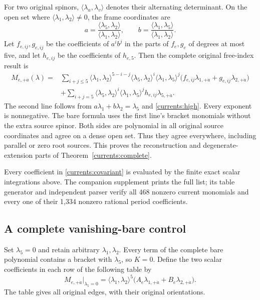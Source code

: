 For two original spinors, $\langle\lambda_u,\lambda_v\rangle$
denotes their alternating determinant. On the open set where
$\langle\lambda_1,\lambda_2\rangle\ne0$, the frame coordinates are
\begin{equation}
 a=\frac{\langle\lambda_5,\lambda_2\rangle}
 {\langle\lambda_1,\lambda_2\rangle},\qquad
 b=\frac{\langle\lambda_1,\lambda_5\rangle}
 {\langle\lambda_1,\lambda_2\rangle}.
\end{equation}
Let $f_{e,ij},g_{e,ij}$ be the coefficients of $a^i b^j$ in the
parts of $f_e,g_e$ of degrees at most five, and let $h_{e,ij}$ be the
coefficients of $h_{e,5}$. Then the complete original free-index result
is
\begin{align}
 M_{e,+\dot a}(\lambda)
 ={}&\sum_{i+j\le5}
 \langle\lambda_1,\lambda_2\rangle^{5-i-j}
 \langle\lambda_5,\lambda_2\rangle^i
 \langle\lambda_1,\lambda_5\rangle^j
 \bigl(f_{e,ij}\lambda_{1,+\dot a}
       +g_{e,ij}\lambda_{2,+\dot a}\bigr)
 \nonumber\\
 &+\sum_{i+j=5}
 \langle\lambda_5,\lambda_2\rangle^i
 \langle\lambda_1,\lambda_5\rangle^j
 h_{e,ij}\lambda_{5,+\dot a}.
 \label{currents:covariant}
\end{align}
The second line follows from
$a\lambda_1+b\lambda_2=\lambda_5$ and
\eqref{currents:high}. Every exponent is nonnegative. The bare formula
uses the first line's bracket monomials without the extra source
spinor. Both sides are polynomial in all original source coordinates
and agree on a dense open set. Thus they agree everywhere, including
parallel or zero root sources. This proves the reconstruction and
degenerate-extension parts of Theorem~\ref{currents:complete}.

Every coefficient in \eqref{currents:covariant} is evaluated by the
finite exact scalar integrations above. The companion supplement
prints the full list; its table generator and independent parser
verify all 468 nonzero current monomials and every one of their
1,334 nonzero rational period coefficients.

\subsection{A complete vanishing-bare control}

Set $\lambda_5=0$ and retain arbitrary $\lambda_1,\lambda_2$.
Every term of the complete bare polynomial contains a bracket with
$\lambda_5$, so $K=0$. Define the two scalar coefficients in each
row of the following table by
\begin{equation}
 M_{e,+\dot a}\big|_{\lambda_5=0}
 =\langle\lambda_1,\lambda_2\rangle^5
 \bigl(A_e\lambda_{1,+\dot a}+B_e\lambda_{2,+\dot a}\bigr).
 \label{currents:barezero}
\end{equation}
The table gives all original edges, with their original orientations.


